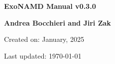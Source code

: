 

\begin{titlepage}

    \centering

    \vspace*{30mm} %
    \textbf{\Huge {ExoNAMD Manual v0.3.0}}


    \vspace{25mm}
    \Large \textbf{{Andrea Bocchieri and Jiri Zak}}

    \vspace*{8mm}
    \small Created on: January, 2025 

    \vspace{2mm}
    \small Last updated: \MonthYearFormat\today


\end{titlepage}

\clearpage
{}
\tableofcontents
\listoffigures
\listoftables
\clearpage
{}